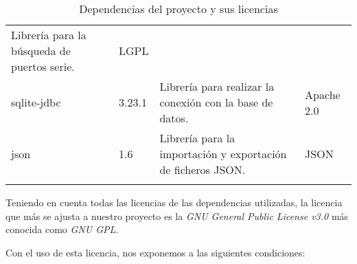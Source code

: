 \begin{longtable}[]{@{}llll@{}}
\begin{minipage}[t]{0.49\columnwidth}
Librería para la búsqueda de puertos serie.\strut
\end{minipage} & \begin{minipage}[t]{0.11\columnwidth}\raggedright\strut
LGPL\strut
\end{minipage}\tabularnewline
\begin{minipage}[t]{0.18\columnwidth}\raggedright\strut
sqlite-jdbc\strut
\end{minipage} & \begin{minipage}[t]{0.08\columnwidth}\raggedright\strut
3.23.1\strut
\end{minipage} & \begin{minipage}[t]{0.49\columnwidth}\raggedright\strut
Librería para realizar la conexión con la base de datos.\strut
\end{minipage} & \begin{minipage}[t]{0.11\columnwidth}\raggedright\strut
Apache 2.0\strut
\end{minipage}\tabularnewline
\begin{minipage}[t]{0.18\columnwidth}\raggedright\strut
json\strut
\end{minipage} & \begin{minipage}[t]{0.08\columnwidth}\raggedright\strut
1.6\strut
\end{minipage} & \begin{minipage}[t]{0.49\columnwidth}\raggedright\strut
Librería para la importación y exportación de ficheros JSON.\strut
\end{minipage} & \begin{minipage}[t]{0.11\columnwidth}\raggedright\strut
JSON\strut
\end{minipage}\tabularnewline
\bottomrule
\caption{Dependencias del proyecto y sus licencias}
\end{longtable}


Teniendo en cuenta todas las licencias de las dependencias utilizadas, la licencia que más se ajusta a nuestro proyecto es la \emph{GNU General Public License v3.0} más conocida como \emph{GNU GPL}\cite{gnu:gpl}.

Con el uso de esta licencia, nos exponemos a las siguientes condiciones:


